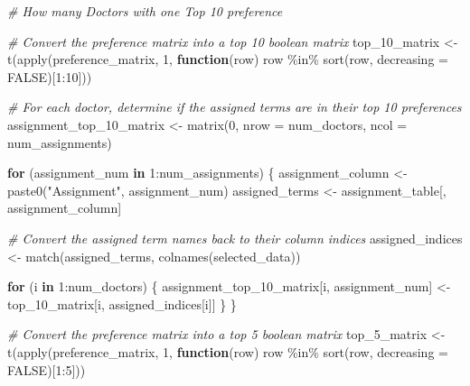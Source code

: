 \documentclass[
]{article}
\newenvironment{Shaded}{\begin{snugshade}}{\end{snugshade}}
\newcommand{\AttributeTok}[1]{\textcolor[rgb]{0.77,0.63,0.00}{#1}}
\newcommand{\CommentTok}[1]{\textcolor[rgb]{0.56,0.35,0.01}{\textit{#1}}}
\newcommand{\ConstantTok}[1]{\textcolor[rgb]{0.00,0.00,0.00}{#1}}
\newcommand{\ControlFlowTok}[1]{\textcolor[rgb]{0.13,0.29,0.53}{\textbf{#1}}}
\newcommand{\DecValTok}[1]{\textcolor[rgb]{0.00,0.00,0.81}{#1}}
\newcommand{\FunctionTok}[1]{\textcolor[rgb]{0.00,0.00,0.00}{#1}}
\newcommand{\NormalTok}[1]{#1}
\newcommand{\OtherTok}[1]{\textcolor[rgb]{0.56,0.35,0.01}{#1}}
\newcommand{\SpecialCharTok}[1]{\textcolor[rgb]{0.00,0.00,0.00}{#1}}
\newcommand{\StringTok}[1]{\textcolor[rgb]{0.31,0.60,0.02}{#1}}
\begin{document}
\begin{Shaded}
\begin{Highlighting}[]
\CommentTok{\# How many Doctors with one Top 10 preference}

\CommentTok{\# Convert the preference matrix into a top 10 boolean matrix}
\NormalTok{top\_10\_matrix }\OtherTok{\textless{}{-}} \FunctionTok{t}\NormalTok{(}\FunctionTok{apply}\NormalTok{(preference\_matrix, }\DecValTok{1}\NormalTok{, }\ControlFlowTok{function}\NormalTok{(row) row }\SpecialCharTok{\%in\%} \FunctionTok{sort}\NormalTok{(row, }\AttributeTok{decreasing =} \ConstantTok{FALSE}\NormalTok{)[}\DecValTok{1}\SpecialCharTok{:}\DecValTok{10}\NormalTok{]))}

\CommentTok{\# For each doctor, determine if the assigned terms are in their top 10 preferences}
\NormalTok{assignment\_top\_10\_matrix }\OtherTok{\textless{}{-}} \FunctionTok{matrix}\NormalTok{(}\DecValTok{0}\NormalTok{, }\AttributeTok{nrow =}\NormalTok{ num\_doctors, }\AttributeTok{ncol =}\NormalTok{ num\_assignments)}

\ControlFlowTok{for}\NormalTok{ (assignment\_num }\ControlFlowTok{in} \DecValTok{1}\SpecialCharTok{:}\NormalTok{num\_assignments) \{}
\NormalTok{  assignment\_column }\OtherTok{\textless{}{-}} \FunctionTok{paste0}\NormalTok{(}\StringTok{"Assignment"}\NormalTok{, assignment\_num)}
\NormalTok{  assigned\_terms }\OtherTok{\textless{}{-}}\NormalTok{ assignment\_table[, assignment\_column]}
  
  \CommentTok{\# Convert the assigned term names back to their column indices}
\NormalTok{  assigned\_indices }\OtherTok{\textless{}{-}} \FunctionTok{match}\NormalTok{(assigned\_terms, }\FunctionTok{colnames}\NormalTok{(selected\_data))}
  
  \ControlFlowTok{for}\NormalTok{ (i }\ControlFlowTok{in} \DecValTok{1}\SpecialCharTok{:}\NormalTok{num\_doctors) \{}
\NormalTok{    assignment\_top\_10\_matrix[i, assignment\_num] }\OtherTok{\textless{}{-}}\NormalTok{ top\_10\_matrix[i, assigned\_indices[i]]}
\NormalTok{  \}}
\NormalTok{\}}

\CommentTok{\# Convert the preference matrix into a top 5 boolean matrix}
\NormalTok{top\_5\_matrix }\OtherTok{\textless{}{-}} \FunctionTok{t}\NormalTok{(}\FunctionTok{apply}\NormalTok{(preference\_matrix, }\DecValTok{1}\NormalTok{, }\ControlFlowTok{function}\NormalTok{(row) row }\SpecialCharTok{\%in\%} \FunctionTok{sort}\NormalTok{(row, }\AttributeTok{decreasing =} \ConstantTok{FALSE}\NormalTok{)[}\DecValTok{1}\SpecialCharTok{:}\DecValTok{5}\NormalTok{]))}


\end{Highlighting}
\end{Shaded}
\end{document}
